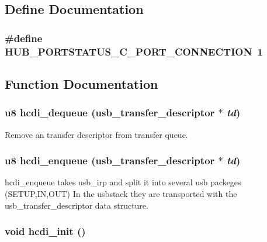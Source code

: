 \subsection{Define Documentation}
\subsubsection{\setlength{\rightskip}{0pt plus 5cm}\#define HUB\_\-PORTSTATUS\_\-C\_\-PORT\_\-CONNECTION~1}\label{sl811hs-hcd_8c_e1fa436fd22f88502b92ee0bf90e264f}




\subsection{Function Documentation}
\subsubsection{\setlength{\rightskip}{0pt plus 5cm}u8 hcdi\_\-dequeue ({\bf usb\_\-transfer\_\-descriptor} $\ast$ {\em td})}\label{sl811hs-hcd_8c_2937060a6cc3d0d69f04ea1d33d24de1}


Remove an transfer descriptor from transfer queue. 
\subsubsection{\setlength{\rightskip}{0pt plus 5cm}u8 hcdi\_\-enqueue ({\bf usb\_\-transfer\_\-descriptor} $\ast$ {\em td})}\label{sl811hs-hcd_8c_156486d5382dea364107d54250a29795}


hcdi\_\-enqueue takes usb\_\-irp and split it into several usb packeges (SETUP,IN,OUT) In the usbstack they are transported with the usb\_\-transfer\_\-descriptor data structure. 
\subsubsection{\setlength{\rightskip}{0pt plus 5cm}void hcdi\_\-init ()}\label{sl811hs-hcd_8c_a5e728976c2dc39c8374ddbea42e9864}


